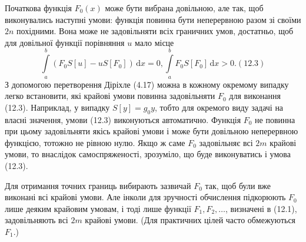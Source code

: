 \documentclass[12pt,a4paper]{article}
\begin{document}
Початкова функція $F_0(x)$ може бути вибрана довільною, але так, щоб виконувались наступні умови: функція повинна бути неперервною разом зі своїми $2n$ похідними. Вона може не задовільняти всіх граничних умов, достатньо, щоб для довільної функції порівняння $u$ мало місце
\[
	\int\limits_a^b (F_0 S[u] - u S[F_0])\,\mathrm{d}x = 0, 
	\int\limits_a^b F_0 S[F_0]\,\mathrm{d}x > 0. (12.3)
\]
З допомогою перетворення Діріхле (4.17) можна в кожному окремому випадку легко встановити, які крайові умови повинна задовільняти $F_0$ для виконання (12.3). Наприклад, у випадку $S[y]=g_0 y$, тобто для окремого виду задачі на власні значення, умови (12.3) виконуються автоматично. Функція $F_0$ не повинна при цьому задовільняти якісь крайові умови і може бути довільною неперервною функцією, тотожно не рівною нулю. Якщо ж саме $F_0$ задовільняє всі $2m$ крайові умови, то внаслідок самоспряженості, зрозуміло, що буде виконуватись і умова (12.3).

Для отримання точних границь вибирають зазвичай $F_0$ так, щоб були вже виконані всі крайові умови. Але інколи для зручності обчислення підкорюють $F_0$ лише деяким крайовим умовам, і тоді лише функції $F_1, F_2, \dots$, визначені в (12.1), задовільняють всі $2m$ крайові умови. (Для практичних цілей часто обмежуються $F_1$.)
\end{document}

